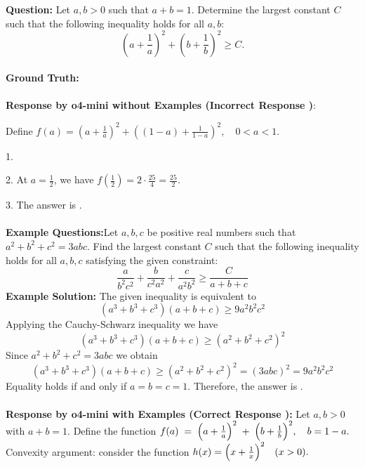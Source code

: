 \begin{examplebox}
\textbf{Question:} Let $a, b > 0$ such that $a + b = 1$. Determine the largest constant $C$ such that the following inequality holds for all $a, b$:
$$
\left(a+\frac{1}{a}\right)^2+\left(b+\frac{1}{b}\right)^2 \geq C.
$$
\\
\textbf{Ground Truth:} 
\\\\
\textbf{Response by o4-mini without Examples (Incorrect Response \xmark)}:

Define
$
f(a) = \left(a + \frac{1}{a} \right)^2 + \left((1 - a) + \frac{1}{1 - a} \right)^2, \quad 0 < a < 1.
$

1. 

2. At \( a = \frac{1}{2} \), we have
    $
    f\left(\frac{1}{2}\right) = 2 \cdot \frac{25}{4} = \frac{25}{2}.
    $

3.  The answer is .
\\\\
\textbf{Example Questions:}Let $a, b, c$ be positive real numbers such that $a^2 + b^2 + c^2 = 3abc$. Find the largest constant $C$ such that the following inequality holds for all $a, b, c$ satisfying the given constraint:
$$
\frac{a}{b^2 c^2} + \frac{b}{c^2 a^2} + \frac{c}{a^2 b^2} \geq \frac{C}{a+b+c}
$$
\textbf{Example Solution:} The given inequality is equivalent to$$\left(a^{3}+b^{3}+c^{3}\right)(a+b+c) \geq 9 a^{2} b^{2} c^{2}$$Applying the Cauchy-Schwarz inequality we have$$\left(a^{3}+b^{3}+c^{3}\right)(a+b+c) \geq\left(a^{2}+b^{2}+c^{2}\right)^{2}$$Since $a^{2}+b^{2}+c^{2}=3 a b c$ we obtain$$\left(a^{3}+b^{3}+c^{3}\right)(a+b+c) \geq\left(a^{2}+b^{2}+c^{2}\right)^{2}=(3 a b c)^{2}=9 a^{2} b^{2} c^{2}$$Equality holds if and only if $a=b=c=1$.
Therefore, the answer is .
\\\\
\textbf{Response by o4-mini with Examples (Correct Response \cmark):}
Let \(a,b>0\) with \(a+b=1\).  Define the function
$
f(a)\;=\;\Bigl(a+\tfrac1a\Bigr)^2\;+\;\Bigl(b+\tfrac1b\Bigr)^2
,\quad b=1-a.
$\\
Convexity argument: consider the function 
    $h(x)=\Bigl(x+\tfrac1x\Bigr)^2\quad(x>0).$ 
    


\end{examplebox}
